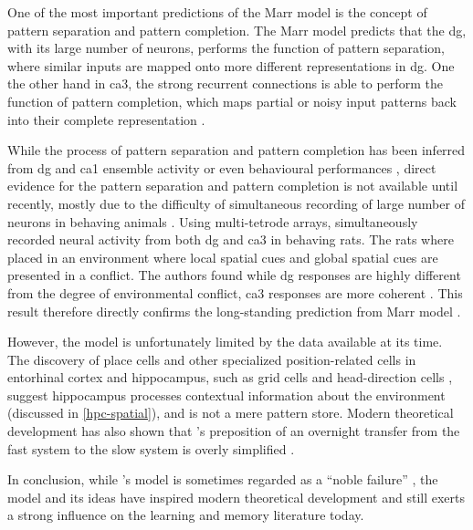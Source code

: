 One of the most important predictions of the Marr model \citep{marr71} is the concept of pattern separation and pattern completion. The Marr model predicts that the \gls{dg}, with its large number of neurons, performs the function of pattern separation, where similar inputs are mapped onto more different representations in \gls{dg}. One the other hand in \gls{ca3}, the strong recurrent connections is able to perform the function of pattern completion, which maps partial or noisy input patterns back into their complete representation \citep{rolls13, knierim16}. 

While the process of pattern separation and pattern completion has been inferred from \gls{dg} and \gls{ca1} ensemble activity or even behavioural performances \citep{santoro13, rolls13}, direct evidence for the pattern separation and pattern completion is not available until recently, mostly due to the difficulty of simultaneous recording of large number of neurons in behaving animals \citep{knierim16}. Using multi-tetrode arrays, \citet{neunuebel14} simultaneously recorded neural activity from both \gls{dg} and \gls{ca3} in behaving rats. The rats where placed in an environment where local spatial cues and global spatial cues are presented in a conflict. The authors found while \gls{dg} responses are highly different from the degree of environmental conflict, \gls{ca3} responses are more coherent \citep{neunuebel14}. This result therefore directly confirms the long-standing prediction from Marr model \cite{rolls13, knierim16}. 

However, the \citet{marr71} model is unfortunately limited by the data available at its time. The discovery of place cells \citep{o'keefe71} and other specialized position-related cells in entorhinal cortex and hippocampus, such as grid cells and head-direction cells \citep{taube90, fyhn04, hafting05}, suggest hippocampus processes contextual information about the environment (discussed in \ref{hpc-spatial}), and is not a mere pattern store. Modern theoretical development has also shown that \citet{marr71}'s preposition of an overnight transfer from the fast system to the slow system is overly simplified \citep{squire09}. 

In conclusion, while \citet{marr71}'s model is sometimes regarded as a ``noble failure'' \citep{willshaw15}, the model and its ideas have inspired modern theoretical development and still exerts a strong influence on the learning and memory literature today. 


